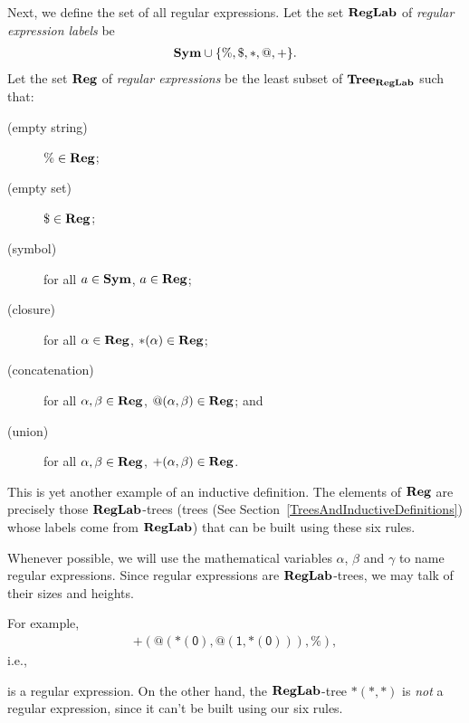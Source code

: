 %
%
%
Next, we define the set of all regular expressions.  Let the set
$\mathbf{RegLab}$ of \emph{regular expression labels} be
\begin{gather*}
\mathbf{Sym}\cup\{\%,\$,{*},@,{+}\} .
\end{gather*}
%
Let the set $\mathbf{Reg}$ of
\emph{regular expressions} be the least subset of
$\mathbf{Tree}_{\mathbf{RegLab}}$ such that:
%
%
%
\begin{description}
\item[\quad(empty string)] $\%\in\mathbf{Reg}$;

\item[\quad(empty set)] $\$\in\mathbf{Reg}$;

\item[\quad(symbol)] for all $a\in\mathbf{Sym}$, $a\in\mathbf{Reg}$;

\item[\quad(closure)] for all $\alpha\in\mathbf{Reg}$, ${*}(\alpha)\in\mathbf{Reg}$;
%
%

\item[\quad(concatenation)] for all $\alpha,\beta\in\mathbf{Reg}$,
$@(\alpha,\beta)\in\mathbf{Reg}$; and
%
%

\item[\quad(union)] for all $\alpha,\beta\in\mathbf{Reg}$, ${+}(\alpha,\beta)\in\mathbf{Reg}$.
%
%
\end{description}
This is yet another example of an inductive definition.  The elements
of $\mathbf{Reg}$ are precisely those $\mathbf{RegLab}$-trees
(trees (See Section~\ref{TreesAndInductiveDefinitions})
whose labels come from $\mathbf{RegLab}$) that can be built using these six
rules.

Whenever possible, we will use the mathematical variables
$\alpha$, $\beta$ and $\gamma$
%
%
to name regular expressions. Since regular expressions are
$\mathbf{RegLab}$-trees, we may talk of their sizes and heights.

For example,
\begin{gather*}
\mathsf{{+}(@({*}(0),@(1,{*}(0))),\%)} ,
\end{gather*}
i.e.,
\begin{center}

\end{center}
is a regular expression.  On the other hand, the $\mathbf{RegLab}$-tree
$*(*,*)$ is \emph{not} a regular expression, since it can't be
built using our six rules.

